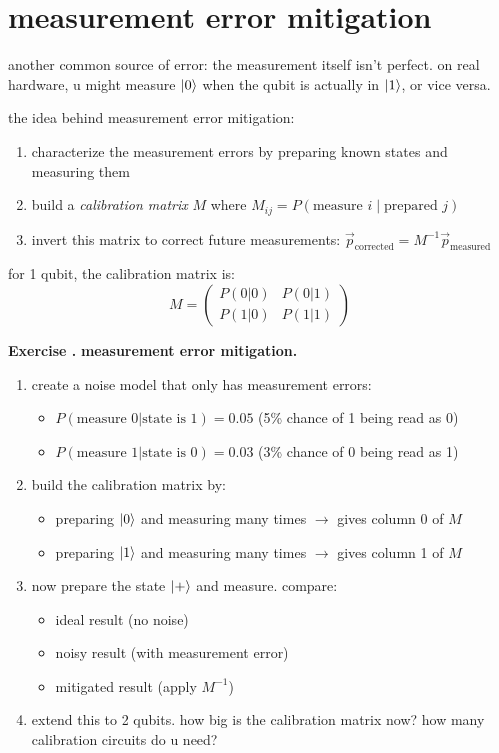 \documentclass[11pt,a4paper]{article}
\theoremstyle{definition}
\theoremstyle{remark}
\newcounter{exercise}[section]
\newenvironment{exercise}{\refstepcounter{exercise}\par\medskip\noindent\textbf{Exercise \theexercise.}\rmfamily}{\medskip}
\begin{document}
\section{measurement error mitigation}

another common source of error: the measurement itself isn't perfect. on real hardware, u might measure $\ket{0}$ when the qubit is actually in $\ket{1}$, or vice versa.

the idea behind measurement error mitigation:
\begin{enumerate}[leftmargin=*]
  \item characterize the measurement errors by preparing known states and measuring them
  \item build a \textit{calibration matrix} $M$ where $M_{ij} = P(\text{measure } i \mid \text{prepared } j)$
  \item invert this matrix to correct future measurements: $\vec{p}_{\text{corrected}} = M^{-1}\vec{p}_{\text{measured}}$
\end{enumerate}

for 1 qubit, the calibration matrix is:
\[
M = \begin{pmatrix}
P(0|0) & P(0|1) \\
P(1|0) & P(1|1)
\end{pmatrix}
\]

\begin{exercise}
\textbf{measurement error mitigation.}
\begin{enumerate}[leftmargin=*]
  \item create a noise model that only has measurement errors:
    \begin{itemize}
      \item $P(\text{measure 0} | \text{state is 1}) = 0.05$ (5\% chance of 1 being read as 0)
      \item $P(\text{measure 1} | \text{state is 0}) = 0.03$ (3\% chance of 0 being read as 1)
    \end{itemize}
  \item build the calibration matrix by:
    \begin{itemize}
      \item preparing $\ket{0}$ and measuring many times $\to$ gives column 0 of $M$
      \item preparing $\ket{1}$ and measuring many times $\to$ gives column 1 of $M$
    \end{itemize}
  \item now prepare the state $\ket{+}$ and measure. compare:
    \begin{itemize}
      \item ideal result (no noise)
      \item noisy result (with measurement error)
      \item mitigated result (apply $M^{-1}$)
    \end{itemize}
  \item extend this to 2 qubits. how big is the calibration matrix now? how many calibration circuits do u need?
\end{enumerate}
\end{exercise}
\end{document}
